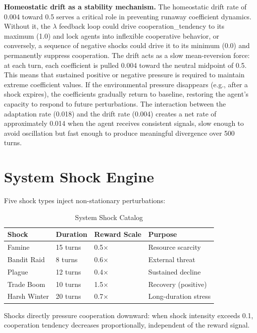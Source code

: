 \documentclass[12pt, a4paper, oneside]{report}
\begin{document}
\textbf{Homeostatic drift as a stability mechanism.}
The homeostatic drift rate of 0.004 toward 0.5 serves a critical role in preventing runaway coefficient dynamics. Without it, the $\lambda$ feedback loop could drive cooperation\_tendency to its maximum (1.0) and lock agents into inflexible cooperative behavior, or conversely, a sequence of negative shocks could drive it to its minimum (0.0) and permanently suppress cooperation. The drift acts as a slow mean-reversion force: at each turn, each coefficient is pulled 0.004 toward the neutral midpoint of 0.5. This means that sustained positive or negative pressure is required to maintain extreme coefficient values. If the environmental pressure disappears (e.g., after a shock expires), the coefficients gradually return to baseline, restoring the agent's capacity to respond to future perturbations. The interaction between the adaptation rate (0.018) and the drift rate (0.004) creates a net rate of approximately 0.014 when the agent receives consistent signals, slow enough to avoid oscillation but fast enough to produce meaningful divergence over 500 turns.

\section{System Shock Engine}
\label{sec:shock-engine}

Five shock types inject non-stationary perturbations:

\begin{table}[H]
\centering
\caption{System Shock Catalog}
\label{tab:shocks}
\begin{tabular}{llll}
\toprule
\textbf{Shock} & \textbf{Duration} & \textbf{Reward Scale} & \textbf{Purpose} \\
\midrule
Famine & 15 turns & 0.5$\times$ & Resource scarcity \\
Bandit Raid & 8 turns & 0.6$\times$ & External threat \\
Plague & 12 turns & 0.4$\times$ & Sustained decline \\
Trade Boom & 10 turns & 1.5$\times$ & Recovery (positive) \\
Harsh Winter & 20 turns & 0.7$\times$ & Long-duration stress \\
\bottomrule
\end{tabular}
\end{table}

Shocks directly pressure cooperation downward: when shock intensity exceeds 0.1, cooperation tendency decreases proportionally, independent of the reward signal.
\end{document}
